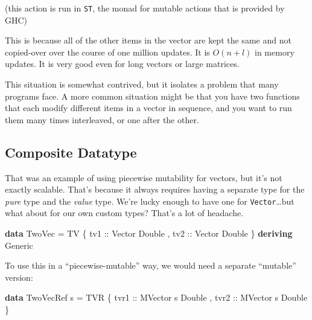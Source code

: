 \documentclass[]{article}
\newenvironment{Shaded}{}{}
\newcommand{\DataTypeTok}[1]{\textcolor[rgb]{0.56,0.13,0.00}{#1}}
\newcommand{\KeywordTok}[1]{\textcolor[rgb]{0.00,0.44,0.13}{\textbf{#1}}}
\newcommand{\NormalTok}[1]{#1}
\newcommand{\OtherTok}[1]{\textcolor[rgb]{0.00,0.44,0.13}{#1}}
\begin{document}
(this action is run in \texttt{ST}, the monad for mutable actions that is
provided by GHC)

This is because all of the other items in the vector are kept the same and not
copied-over over the course of one million updates. It is \(O(n+l)\) in memory
updates. It is very good even for long vectors or large matrices.

This situation is somewhat contrived, but it isolates a problem that many
programs face. A more common situation might be that you have two functions that
each modify different items in a vector in sequence, and you want to run them
many times interleaved, or one after the other.

\subsection{Composite Datatype}\label{composite-datatype}

That was an example of using piecewise mutability for vectors, but it's not
exactly scalable. That's because it always requires having a separate type for
the \emph{pure} type and the \emph{value} type. We're lucky enough to have one
for \texttt{Vector}\ldots but what about for our own custom types? That's a lot
of headache.

\begin{Shaded}
\begin{Highlighting}[]
\KeywordTok{data} \DataTypeTok{TwoVec} \OtherTok{=} \DataTypeTok{TV}\NormalTok{ \{}\OtherTok{ tv1 ::} \DataTypeTok{Vector} \DataTypeTok{Double}
\NormalTok{                 ,}\OtherTok{ tv2 ::} \DataTypeTok{Vector} \DataTypeTok{Double}
\NormalTok{                 \}}
  \KeywordTok{deriving} \DataTypeTok{Generic}
\end{Highlighting}
\end{Shaded}

To use this in a ``piecewise-mutable'' way, we would need a separate ``mutable''
version:

\begin{Shaded}
\begin{Highlighting}[]
\KeywordTok{data} \DataTypeTok{TwoVecRef}\NormalTok{ s }\OtherTok{=} \DataTypeTok{TVR}\NormalTok{ \{}\OtherTok{ tvr1 ::} \DataTypeTok{MVector}\NormalTok{ s }\DataTypeTok{Double}
\NormalTok{                       ,}\OtherTok{ tvr2 ::} \DataTypeTok{MVector}\NormalTok{ s }\DataTypeTok{Double}
\NormalTok{                       \}}
\end{Highlighting}
\end{Shaded}
\end{document}
